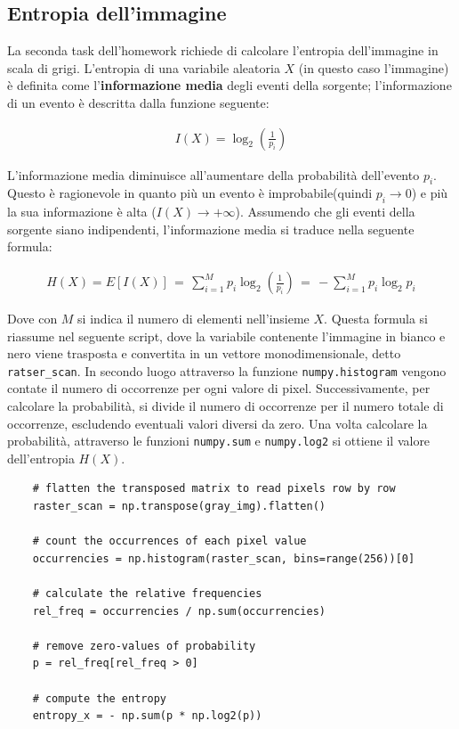 \subsection{Entropia dell'immagine}\label{img-entropy}
La seconda task dell'homework richiede di calcolare l'entropia dell'immagine in scala di grigi. L'entropia di una variabile aleatoria $X$ (in questo caso l'immagine) è definita come l'\textbf{informazione media} degli eventi della sorgente; l'informazione di un evento è descritta dalla funzione seguente:

\begin{gather*}
    I(X) = \log_2\left( \frac{1}{p_i} \right)
\end{gather*}

\noindent L'informazione media diminuisce all'aumentare della probabilità dell'evento $p_i$. Questo è ragionevole in quanto più un evento è improbabile(quindi $p_i \to 0$) e più la sua informazione è alta ($I(X) \to +\infty$). Assumendo che gli eventi della sorgente siano indipendenti, l'informazione media si traduce nella seguente formula:

\begin{gather*}
    H(X) = E[I(X)] \, = \, \sum_{i = 1}^M p_i\log_2\left( \frac{1}{p_i} \right) \, = \, - \sum_{i = 1}^M p_i\log_2{p_i}
\end{gather*}

\noindent Dove con $M$ si indica il numero di elementi nell'insieme $X$. Questa formula si riassume nel seguente script, dove la variabile contenente l'immagine in bianco e nero viene trasposta e convertita in un vettore monodimensionale, detto \texttt{ratser\_scan}. In secondo luogo attraverso la funzione \texttt{numpy.histogram} vengono contate il numero di occorrenze per ogni valore di pixel. Successivamente, per calcolare la probabilità, si divide il numero di occorrenze per il numero totale di occorrenze, escludendo eventuali valori diversi da zero. Una volta calcolare la probabilità, attraverso le funzioni  \texttt{numpy.sum} e \texttt{numpy.log2} si ottiene il valore dell'entropia $H(X)$.


\begin{lstlisting}
    # flatten the transposed matrix to read pixels row by row
    raster_scan = np.transpose(gray_img).flatten()

    # count the occurrences of each pixel value
    occurrencies = np.histogram(raster_scan, bins=range(256))[0]

    # calculate the relative frequencies
    rel_freq = occurrencies / np.sum(occurrencies)

    # remove zero-values of probability
    p = rel_freq[rel_freq > 0]

    # compute the entropy
    entropy_x = - np.sum(p * np.log2(p))
\end{lstlisting}

